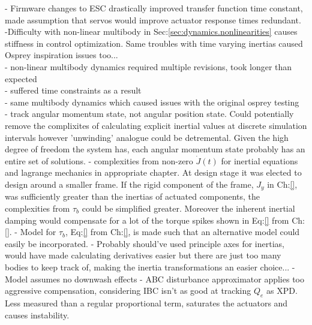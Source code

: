 - Firmware changes to ESC drastically improved transfer function time constant, made assumption that servos would improve actuator response times redundant.\\
-Difficulty with non-linear multibody in Sec:\ref{sec:dynamics.nonlinearities} causes stiffness in control optimization. Same troubles with time varying inertias caused Osprey inspiration issues too...\\
- non-linear multibody dynamics required multiple revisions, took longer than expected\\
- suffered time constraints as a result\\
- same multibody dynamics which caused issues with the original osprey testing\cite{}\\
- track angular momentum state, not angular position state. Could potentially remove the complixites of calculating explicit inertial values at discrete simulation intervals however 'unwinding' analogue could be detremental. Given the high degree of freedom the system has, each angular momentum state probably has an entire set of solutions.
- complexities from non-zero $\dot{J}(t)$ for inertial equations and lagrange mechanics in appropriate chapter. At design stage it was elected to design around a smaller frame. If the rigid component of the frame, $J_y$ in Ch:\ref{}, was sufficiently greater than the inertias of actuated components, the complexities from $\tau_b$ could be simplified greater. Moreover the inherent inertial damping would compensate for a lot of the torque spikes shown in Eq:\ref{} from Ch:\ref{}.
- Model for $\tau_b$, Eq:\ref{} from Ch:\ref{}, is made such that an alternative model could easily be incorporated.
- Probably should've used principle axes for inertias, would have made calculating derivatives easier but there are just too many bodies to keep track of, making the inertia transformations an easier choice...
-Model assumes no downwash effects
- ABC disturbance approximator applies too aggressive compensation, considering IBC isn't as good at tracking $Q_e$ as XPD. Less measured than a regular proportional term, saturates the actuators and causes instability.
